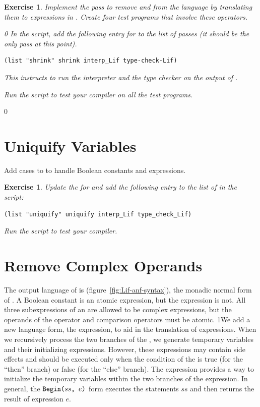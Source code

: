 \documentclass[7x10]{TimesAPriori_MIT}%
\def\racketEd{0}
\def\pythonEd{1}
\def\edition{1}
\newcommand{\pythonColor}[0]{}
\newcommand{\python}[1]{{\if\edition\pythonEd\pythonColor #1\fi}}
\newtheorem{exercise}[theorem]{Exercise}
\numberwithin{theorem}{chapter}
\numberwithin{definition}{chapter}
\numberwithin{equation}{chapter}
\begin{document}
\begin{exercise}\normalfont\normalsize
%
Implement the pass  to remove  and  from
the language by translating them to  expressions in \LangIf{}.
%
Create four test programs that involve these operators.
%
{\if\edition\racketEd    
In the  script, add the following entry for
 to the list of passes (it should be the only pass at
this point).
\begin{lstlisting}
(list "shrink" shrink interp_Lif type-check-Lif)
\end{lstlisting}
This instructs  to run the interpreter
 and the type checker  on the
output of .
\fi}
%
Run the script to test your compiler on all the test programs.
\end{exercise}

{\if\edition\racketEd    

\section{Uniquify Variables}
\label{sec:uniquify-Lif}

Add cases to  to handle Boolean constants and
 expressions.

\begin{exercise}\normalfont\normalsize
Update the  for \LangIf{} and add the following
entry to the list of  in the  script:
\begin{lstlisting}
(list "uniquify" uniquify interp_Lif type_check_Lif)
\end{lstlisting}
Run the script to test your compiler.
\end{exercise}

\fi}

\section{Remove Complex Operands}
\label{sec:remove-complex-opera-Lif}

The output language of  is
\LangIfANF{} (figure~\ref{fig:Lif-anf-syntax}), the monadic
normal form of \LangIf{}.  A Boolean constant is an atomic expression,
but the  expression is not.  All three subexpressions of an
 are allowed to be complex expressions, but the operands of
the  operator and comparison operators must be atomic.
%
\python{We add a new language form, the  expression, to aid
  in the translation of \code{if} expressions. When we recursively
  process the two branches of the \code{if}, we generate temporary
  variables and their initializing expressions. However, these
  expressions may contain side effects and should be executed only
  when the condition of the \code{if} is true (for the ``then''
  branch) or false (for the ``else'' branch). The \code{Begin} expression
  provides a way to initialize the temporary variables within the two branches
  of the \code{if} expression.  In general, the $\texttt{Begin}\texttt{(} ss\texttt{, }e\texttt{)}$
  form executes the statements $ss$ and then returns the result of
  expression $e$.}
\end{document}
